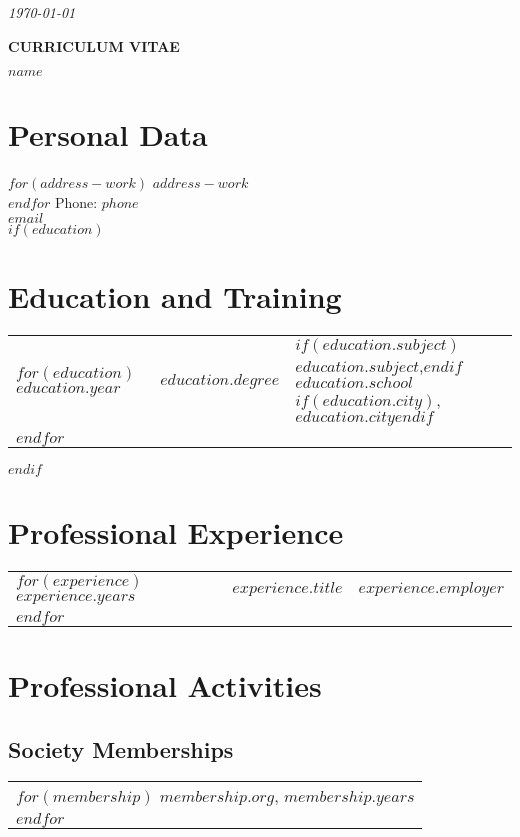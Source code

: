 \documentclass[martgin, line]{article}
\begin{document}
\begin{flushright}
  \textit{\today}
\end{flushright}

\begin{center}
  \textbf{CURRICULUM VITAE}

  \textbf{$name$}
\end{center}

\section*{Personal Data}

$for(address-work)$
$address-work$\\
$endfor$
Phone: $phone$\\
\href{mailto:$email$}{$email$}\\


$if(education)$
\section*{Education and Training}
\noindent
\begin{tabular}{lll}
$for(education)$
$education.year$&$education.degree$&
$if(education.subject)$$education.subject$,$endif$
$education.school$$if(education.city)$, $education.city$$endif$\\
$endfor$
\end{tabular}
$endif$

\section*{Professional Experience}
\noindent
\begin{tabular}{lll}
$for(experience)$
$experience.years$&
$experience.title$&
$experience.employer$\\
$endfor$
\end{tabular}

\section*{Professional Activities}

\subsection*{Society Memberships}

\begin{tabular}{l}
$for(membership)$
$membership.org$, $membership.years$\\
$endfor$
\end{tabular}
\end{document}
